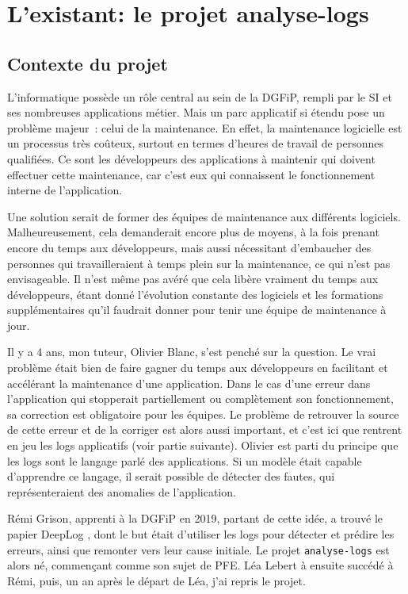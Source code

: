 \documentclass[openany, 11pt]{memoir}
\begin{document}
\newpage
\chapter{L'existant: le projet analyse-logs}

\section{Contexte du projet}

L'informatique possède un rôle central au sein de la \gls{DGFiP}, rempli par le \gls{SI} et ses nombreuses applications métier. Mais un parc applicatif si étendu pose un problème majeur~: celui de la maintenance. En effet, la maintenance logicielle est un processus très coûteux, surtout en termes d'heures de travail de personnes qualifiées. Ce sont les développeurs des applications à maintenir qui doivent effectuer cette maintenance, car c'est eux qui connaissent le fonctionnement interne de l'application.

Une solution serait de former des équipes de maintenance aux différents logiciels. Malheureusement, cela demanderait encore plus de moyens, à la fois prenant encore du temps aux développeurs, mais aussi nécessitant d'embaucher des personnes qui travailleraient à temps plein sur la maintenance, ce qui n'est pas envisageable. Il n'est même pas avéré que cela libère vraiment du temps aux développeurs, étant donné l'évolution constante des logiciels et les formations supplémentaires qu'il faudrait donner pour tenir une équipe de maintenance à jour.

\bigskip
Il y a 4 ans, mon tuteur, Olivier Blanc, s'est penché sur la question. Le vrai problème était bien de faire gagner du temps aux développeurs en facilitant et accélérant la maintenance d'une application. Dans le cas d'une erreur dans l'application qui stopperait partiellement ou complètement son fonctionnement, sa correction est obligatoire pour les équipes. Le problème de retrouver la source de cette erreur et de la corriger est alors aussi important, et c'est ici que rentrent en jeu les \glspl{log} applicatifs (voir partie suivante). Olivier est parti du principe que les logs sont le langage parlé des applications. Si un modèle était capable d'apprendre ce langage, il serait possible de détecter des fautes, qui représenteraient des anomalies de l'application.

Rémi Grison, apprenti à la DGFiP en 2019, partant de cette idée, a trouvé le papier DeepLog \cite{deeplog}, dont le but était d'utiliser les logs pour détecter et prédire les erreurs, ainsi que remonter vers leur cause initiale. Le projet \texttt{analyse-logs} est alors né, commençant comme son sujet de PFE. Léa Lebert à ensuite succédé à Rémi, puis, un an après le départ de Léa, j'ai repris le projet.
\end{document}
